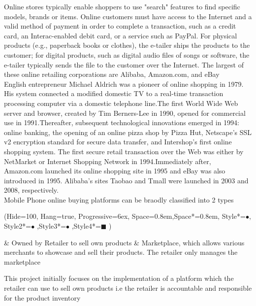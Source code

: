 \documentclass[hidelinks,a4paper,12pt]{article}
\begin{document}
Online stores typically enable shoppers to use "search" features to find specific models, brands or items. Online customers must have access to the Internet and a valid method of payment in order to complete a transaction, such as a credit card, an Interac-enabled debit card, or a service such as PayPal. For physical products (e.g., paperback books or clothes), the e-tailer ships the products to the customer; for digital products, such as digital audio files of songs or software, the e-tailer typically sends the file to the customer over the Internet. The largest of these online retailing corporations are Alibaba, Amazon.com, and eBay
\\

English entrepreneur Michael Aldrich was a pioneer of online shopping in 1979. His system connected a modified domestic TV to a real-time transaction processing computer via a domestic telephone line.The first World Wide Web server and browser, created by Tim Berners-Lee in 1990, opened for commercial use in 1991.Thereafter, subsequent technological innovations emerged in 1994: online banking, the opening of an online pizza shop by Pizza Hut, Netscape's SSL v2 encryption standard for secure data transfer, and Intershop's first online shopping system. The first secure retail transaction over the Web was either by NetMarket or Internet Shopping Network in 1994.Immediately after, Amazon.com launched its online shopping site in 1995 and eBay was also introduced in 1995. Alibaba's sites Taobao and Tmall were launched in 2003 and 2008, respectively.
\\

Mobile Phone online buying platforms can be braodly classified into 2 types

\ListProperties(Hide=100, Hang=true, Progressive=6ex, Space=0.8em,Space*=0.8em, Style*=$\bullet$, Style2*=$\bullet$ ,Style3*=$\bullet$ ,Style4*=\tiny$\blacksquare$ )

\begin{easylist}
& \thinspace Owned by Retailer to sell own products 
& \thinspace Marketplace, which allows various merchants to showcase and sell their products. The retailer only manages the marketplace
\end{easylist}

\bigskip

This project initially focuses on the implementation of a platform which the retailer can use to sell own products i.e the retailer is accountable and responsible for the product inventory 
\end{document}
